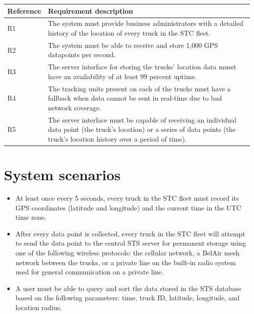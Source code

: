\documentclass[a4paper,11pt]{report}
\begin{document}
\begin{center}
  \begin{tabular}[h!]{| p{} | p{} |}
    \hline
    \rowcolor{gray}
    Reference & Requirement description \\
    \hline
    \hline
    R1 & The system must provide business administrators with a detailed
    history of the location of every truck in the STC fleet. \\
    \hline
    R2 & The system must be able to receive and store 1,000 GPS datapoints per
    second. \\
    \hline
    R3 & The server interface for storing the trucks' location data musst have
    an availability of at least 99 percent uptime. \\
    \hline
    R4 & The tracking units present on each of the trucks must have a fallback
    when data cannot be sent in real-time due to bad network coverage. \\
    \hline
    R5 & The server interface must be capable of receiving an individual data
    point (the truck's location) or a series of data points (the truck's
    location history over a period of time). \\
    \hline
  \end{tabular}
\end{center}

\section{System scenarios}
\label{sec:system-scenarios}

\begin{itemize}
  \item At least once every 5 seconds, every truck in the STC fleet must record its
    GPS coordinates (latitude and longitude) and the current time in the UTC
    time zone.
  \item After every data point is collected, every truck in the STC fleet will
    attempt to send the data point to the central STS server for permanent
    storage using one of the following wireless protocols: the cellular
    network, a BelAir mesh network between the trucks, or a private line on
    the built-in radio system used for general communication on a private line.
  \item A user must be able to query and sort the data stored in the STS
    database based on the following parameters: time, truck ID, latitude,
    longitude, and location radius.
\end{itemize}
\end{document}
